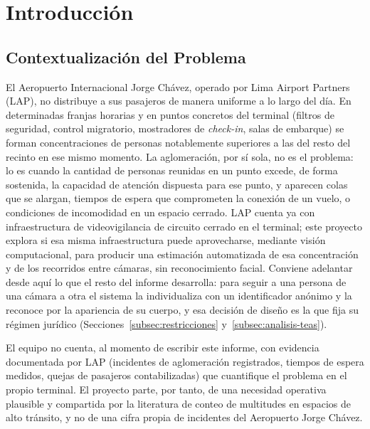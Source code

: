 \section{Introducción}
\label{sec:introduccion}

\subsection{Contextualización del Problema}
\label{subsec:contextualizacion}

El Aeropuerto Internacional Jorge Chávez, operado por Lima Airport Partners (LAP), no
distribuye a sus pasajeros de manera uniforme a lo largo del día. En determinadas franjas
horarias y en puntos concretos del terminal (filtros de seguridad, control migratorio,
mostradores de \emph{check-in}, salas de embarque) se forman concentraciones de personas
notablemente superiores a las del resto del recinto en ese mismo momento. La aglomeración,
por sí sola, no es el problema: lo es cuando la cantidad de personas reunidas en un punto
excede, de forma sostenida, la capacidad de atención dispuesta para ese punto, y aparecen
colas que se alargan, tiempos de espera que comprometen la conexión de un vuelo, o
condiciones de incomodidad en un espacio cerrado. LAP cuenta ya con infraestructura de
videovigilancia de circuito cerrado en el terminal; este proyecto explora si esa misma
infraestructura puede aprovecharse, mediante visión computacional, para producir una
estimación automatizada de esa concentración y de los recorridos entre cámaras, sin
reconocimiento facial. Conviene adelantar desde aquí lo que el resto del informe desarrolla: para
seguir a una persona de una cámara a otra el sistema la individualiza con un identificador
anónimo y la reconoce por la apariencia de su cuerpo, y esa decisión de diseño es la que fija su
régimen jurídico (Secciones~\ref{subsec:restricciones} y~\ref{subsec:analisis-teas}).

El equipo no cuenta, al momento de escribir este informe, con evidencia documentada por LAP (incidentes de
aglomeración registrados, tiempos de espera medidos, quejas de pasajeros contabilizadas) que
cuantifique el problema en el propio terminal. El proyecto parte, por tanto, de una necesidad
operativa plausible y compartida por la literatura de conteo de multitudes en espacios de alto
tránsito, y no de una cifra propia de incidentes del Aeropuerto Jorge Chávez.

